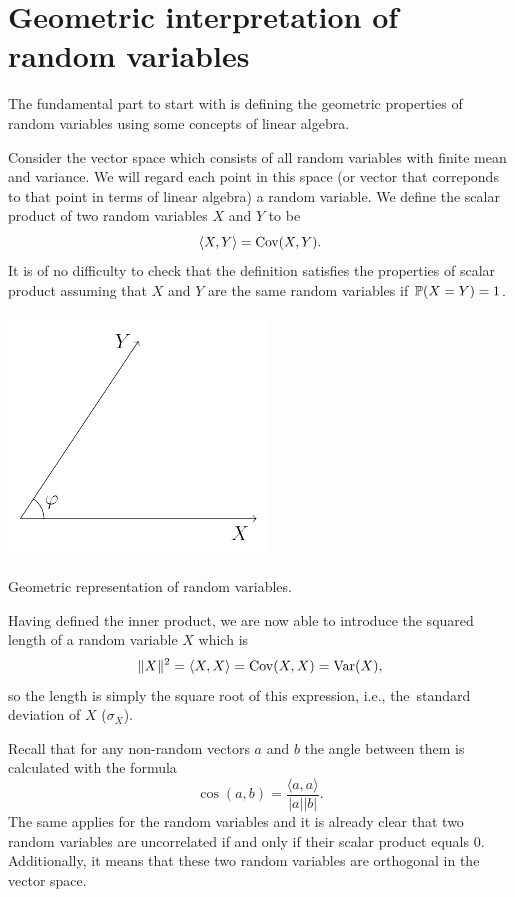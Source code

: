 \section{Geometric interpretation of random variables}\label{rvs}

The fundamental part to start with is defining the geometric properties of random
variables using some concepts of linear algebra.

Consider the vector space which consists of all random variables with finite
mean and variance.
We will regard each point in this space (or vector that correponds to that point
in terms of linear algebra) a random variable.
We define the scalar product of two random variables $X$ and $Y$ to be
\[
\langle X, Y \rangle = \Cov(X,Y).
\]
It is of no difficulty to check that the definition satisfies the properties
of scalar product assuming that $X$ and $Y$ are the same random variables
if $\P(X=Y)=1$.

\begin{marginfigure}
\includegraphics{figures/01_corr_def.pdf}
\caption{Geometric representation of random variables.}
\label{fig:corr_def}
\end{marginfigure}

Having defined the inner product, we are now able to introduce the squared
length of a random variable $X$ which is
\[
\lVert X \rVert^2 = \langle X, X \rangle = \Cov(X,X) = \Var(X),
\]
so the length is simply the square root of this expression, i.e., the~standard
deviation of $X$ ($\sigma_X$).

Recall that for any non-random vectors $a$ and $b$ the angle
between them is calculated with the formula
\[
\cos(a, b) = \frac{\langle a,  a\rangle}{|a| |b|}.
\]
The same applies for the random variables and it is already clear that
two random variables are uncorrelated if and only if their scalar product
equals $0$. Additionally, it means that these two random variables
are orthogonal in the vector space.


